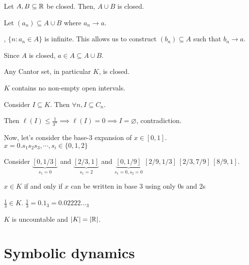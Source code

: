 \documentclass[class=pmath370,tikz,notes]{agony}
\begin{document}
\begin{prop}
  Let $A,B \subseteq \mathbb{R}$ be closed.
  Then, $A \cup B$ is closed.
\end{prop}
\begin{prf}
  Let $(a_n) \subseteq A \cup B$ where $a_n \to a$.

  \WLOG, $\{n : a_n \in A\}$ is infinite.
  This allows us to construct $(b_n) \subseteq A$ such that $b_n \to a$.

  Since $A$ is closed, $a \in A \subseteq A \cup B$.
\end{prf}

\begin{theorem}
  Any Cantor set, in particular $K$, is closed.
\end{theorem}

\begin{theorem}
  $K$ contains no non-empty open intervals.
\end{theorem}
\begin{prf}
  Consider $I \subseteq K$. Then $\forall n, I \subseteq C_n$.

  Then $\ell(I) \leq \frac{1}{3^n} \implies \ell(I)=0 \implies I=\varnothing$, contradiction.
\end{prf}

Now, let's consider the base-3 expansion of $x \in [0,1]$.
$x=0.s_1s_2s_3, \cdots, s_i \in \{0, 1, 2\}$

Consider $\underbrace{[0,1/3]}_{s_1=0}$ and $\underbrace{[2/3, 1]}_{s_1=2}$ and
$\underbrace{[0, 1/9]}_{s_1=0, s_2=0} \ [2/9, 1/3] \ [2/3, 7/9] \ [8/9, 1]$.

\begin{remark}\label{rem:ternary}
  $x \in K$ if and only if $x$ can be written in base 3 using only 0s and 2s
\end{remark}

\begin{example}
  $\frac{1}{3} \in K$. $\frac{1}{3} = 0.1_3 = 0.02222\dots_3$
\end{example}

\begin{theorem}
  $K$ is uncountable and $\abs{K} = \abs{\mathbb{R}}$.
\end{theorem}


\chapter{Symbolic dynamics}
\end{document}
